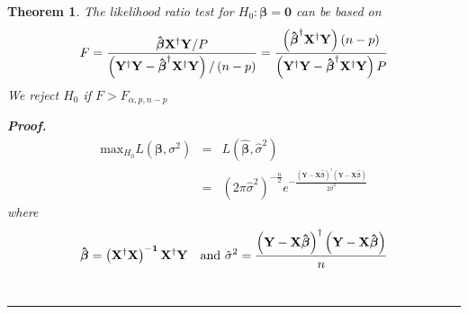 \documentclass{article}
\newtheorem{theorem}{Theorem}
\newenvironment{proof}[1][Proof]{\noindent\textbf{#1.} }{\ \rule{0.5em}{0.5em}}
\begin{document}
\bigskip 

\begin{theorem}
The likelihood ratio test for $H_{0}:\mathbf{\beta =0}$ can be based on%
\begin{equation*}
F=\frac{\mathbf{\hat{\beta}X^{\dagger }Y}/P}{\left( \mathbf{Y^{\dagger }Y}-%
\mathbf{\hat{\beta}}^{\dagger }\mathbf{X^{\dagger }Y}\right) /\left(
n-p\right) }=\frac{\left( \mathbf{\hat{\beta}}^{\dagger }\mathbf{X^{\dagger
}Y}\right) \left( n-p\right) }{\left( \mathbf{Y^{\dagger }Y}-\mathbf{\hat{%
\beta}}^{\dagger }\mathbf{X^{\dagger }Y}\right) P}
\end{equation*}%
We reject $H_{0}$ if $F>F_{\alpha ,p,n-p}$

\begin{proof}
\begin{eqnarray*}
\text{max}_{H_{0}}L\left( \mathbf{\beta },\sigma ^{2}\right)  &=&L\left( 
\mathbf{\hat{\beta}},\hat{\sigma}^{2}\right)  \\
&=&\left( 2\pi \hat{\sigma}^{2}\right) ^{-\frac{n}{2}}e^{-\frac{\left( 
\mathbf{Y-X\hat{\beta}}\right) ^{\dagger }\left( \mathbf{Y-X\hat{\beta}}%
\right) }{2\hat{\sigma}^{2}}}
\end{eqnarray*}%
where%
\begin{equation*}
\mathbf{\hat{\beta}}=\mathbf{\left( \mathbf{X}^{\dagger }\mathbf{X}\right)
^{-1}X^{\dagger }Y}\text{ and }\hat{\sigma}^{2}=\frac{\left( \mathbf{Y-X\hat{%
\beta}}\right) ^{\dagger }\left( \mathbf{Y-X\hat{\beta}}\right) }{n}
\end{equation*}
\end{proof}
\end{theorem}
\end{document}
